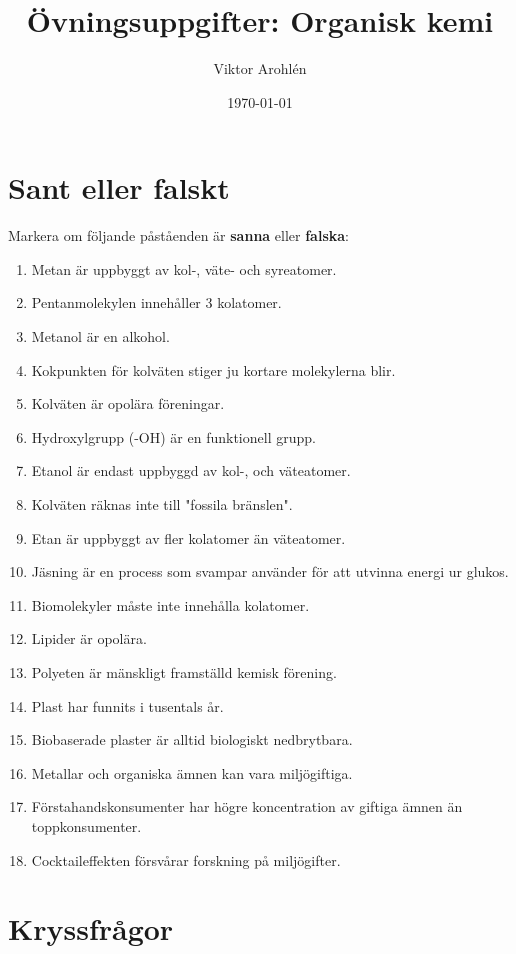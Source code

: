 \documentclass{article}
\title{Övningsuppgifter: Organisk kemi}
\author{Viktor Arohlén}
\date{\today}
\begin{document}
\maketitle

\section*{Sant eller falskt}

Markera om följande påståenden är \textbf{sanna} eller \textbf{falska}:

\begin{enumerate}[label=\arabic*.]
    \item Metan är uppbyggt av kol-, väte- och syreatomer.
    \item Pentanmolekylen innehåller 3 kolatomer.
    \item Metanol är en alkohol.
    \item Kokpunkten för kolväten stiger ju kortare molekylerna blir.
    \item Kolväten är opolära föreningar.
    \item Hydroxylgrupp (-OH) är en funktionell grupp.
    \item Etanol är endast uppbyggd av kol-, och väteatomer.
    \item Kolväten räknas inte till "fossila bränslen".
    \item Etan är uppbyggt av fler kolatomer än väteatomer.
    \item Jäsning är en process som svampar använder för att utvinna energi ur glukos.
    \item Biomolekyler måste inte innehålla kolatomer.
    \item Lipider är opolära.
    \item Polyeten är mänskligt framställd kemisk förening.
    \item Plast har funnits i tusentals år.
    \item Biobaserade plaster är alltid biologiskt nedbrytbara.
    \item Metallar och organiska ämnen kan vara miljögiftiga.
    \item Förstahandskonsumenter har högre koncentration av giftiga ämnen än toppkonsumenter.
    \item Cocktaileffekten försvårar forskning på miljögifter.
\end{enumerate}

\break

\section*{Kryssfrågor}
\end{document}
